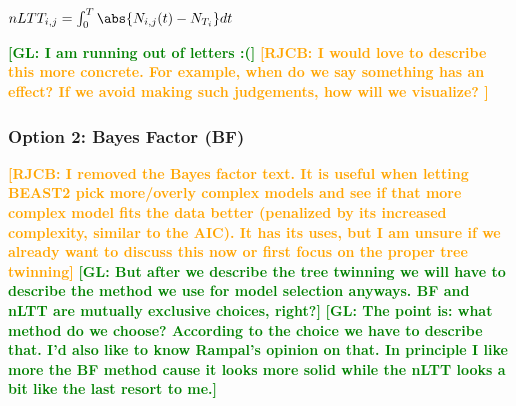 \documentclass{article}
\newcommand*\richel[1]{\textcolor{orange}{\textbf{[RJCB: #1]}}}
\newcommand*\gio[1]{\textcolor{green}{\textbf{[GL: #1]}}}
\begin{document}
\begin{itemize}
$nLTT_{i,j} = \int_{0}^{T} \abs{N_{i,j}(t) - N_{T_{i}}} dt$

\gio{I am running out of letters :(}
\richel{
  I would love to describe this more concrete. For example, when do
  we say something has an effect? If we avoid making such judgements,
  how will we visualize?
}

\subsubsection{Option 2: Bayes Factor (BF)}

\richel{I removed the Bayes factor text. It is useful when letting BEAST2
pick more/overly complex models and see if that more complex model fits the
data better (penalized by its increased complexity, similar to the AIC). It has
its uses, but I am unsure if we already want to discuss this now
or first focus on the proper tree twinning}
\gio{But after we describe the tree twinning we will have to describe the method we use for model selection anyways. BF and nLTT are mutually exclusive choices, right?}
\gio{The point is: what method do we choose? According to the choice we have to describe that. I'd also like to know Rampal's opinion on that. In principle I like more the BF method cause it looks more solid while the nLTT looks a bit like the last resort to me.}



\end{itemize}

\end{document}

